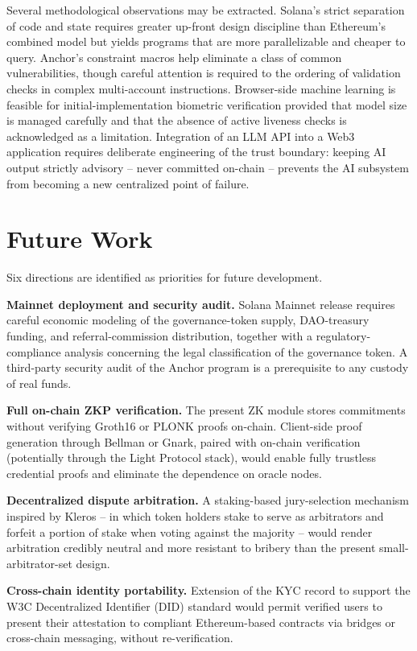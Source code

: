 Several methodological observations may be extracted. Solana's strict separation of code and state requires greater up-front design discipline than Ethereum's combined model but yields programs that are more parallelizable and cheaper to query. Anchor's constraint macros help eliminate a class of common vulnerabilities, though careful attention is required to the ordering of validation checks in complex multi-account instructions. Browser-side machine learning is feasible for initial-implementation biometric verification provided that model size is managed carefully and that the absence of active liveness checks is acknowledged as a limitation. Integration of an LLM API into a Web3 application requires deliberate engineering of the trust boundary: keeping AI output strictly advisory -- never committed on-chain -- prevents the AI subsystem from becoming a new centralized point of failure.

\section{Future Work}
\label{section:6.2}

Six directions are identified as priorities for future development.

\textbf{Mainnet deployment and security audit.} Solana Mainnet release requires careful economic modeling of the governance-token supply, DAO-treasury funding, and referral-commission distribution, together with a regulatory-compliance analysis concerning the legal classification of the governance token. A third-party security audit of the Anchor program is a prerequisite to any custody of real funds.

\textbf{Full on-chain ZKP verification.} The present ZK module stores commitments without verifying Groth16 or PLONK proofs on-chain. Client-side proof generation through Bellman or Gnark, paired with on-chain verification (potentially through the Light Protocol stack), would enable fully trustless credential proofs and eliminate the dependence on oracle nodes.

\textbf{Decentralized dispute arbitration.} A staking-based jury-selection mechanism inspired by Kleros -- in which token holders stake to serve as arbitrators and forfeit a portion of stake when voting against the majority -- would render arbitration credibly neutral and more resistant to bribery than the present small-arbitrator-set design.

\textbf{Cross-chain identity portability.} Extension of the KYC record to support the W3C Decentralized Identifier (DID) standard would permit verified users to present their attestation to compliant Ethereum-based contracts via bridges or cross-chain messaging, without re-verification.

